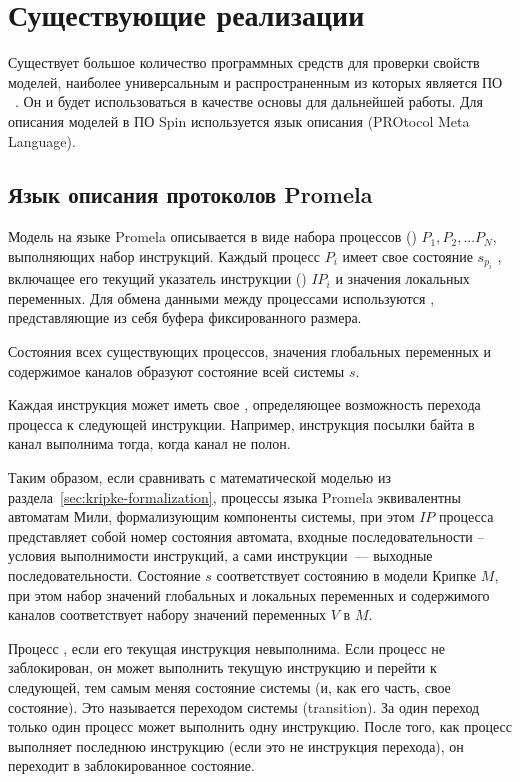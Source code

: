 
\section{Существующие реализации }
\label{sec:analogues}

Существует большое количество программных средств для проверки свойств моделей, наиболее
универсальным и распространенным из которых является ПО ~\cite{SpinRoot}. Он и
будет использоваться в качестве основы для дальнейшей работы. Для описания моделей в ПО
Spin используется язык описания  (PROtocol Meta Language).

\subsection{Язык описания протоколов Promela}
\label{sec:promela}

Модель на языке Promela описывается в виде набора процессов () $P_1, P_2,
... P_N$, выполняющих набор инструкций. Каждый процесс $P_i$ имеет свое состояние
$s_{p_i}$ , включащее его текущий указатель инструкции () $IP_i$
и значения локальных переменных. Для обмена данными между процессами используются
, представляющие из себя буфера фиксированного размера.

Состояния всех существующих процессов, значения глобальных переменных и содержимое каналов
образуют состояние всей системы $s$.

Каждая инструкция может иметь свое , определяющее возможность
перехода процесса к следующей инструкции. Например, инструкция посылки байта в канал
выполнима тогда, когда канал не полон.

Таким образом, если сравнивать с математической моделью из
раздела~\ref{sec:kripke-formalization}, процессы языка Promela эквивалентны автоматам
Мили, формализующим компоненты системы, при этом $IP$ процесса представляет собой номер
состояния автомата, входные последовательности -- условия выполнимости инструкций, а сами
инструкции~--- выходные последовательности. Состояние $s$ соответствует состоянию в модели
Крипке $M$, при этом набор значений глобальных и локальных переменных и содержимого
каналов соответствует набору значений переменных $V$ в $M$.

Процесс , если его текущая инструкция невыполнима. Если процесс не
заблокирован, он может выполнить текущую инструкцию и перейти к следующей, тем самым меняя
состояние системы (и, как его часть, свое состояние). Это называется переходом системы
(transition). За один переход только один процесс может выполнить одну инструкцию. После
того, как процесс выполняет последнюю инструкцию (если это не инструкция перехода), он
переходит в заблокированное состояние.

